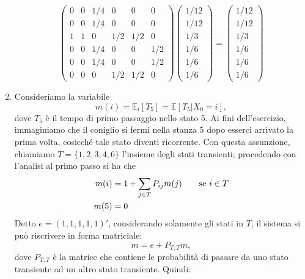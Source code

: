 \documentclass[
	12pt, %
]{fphw}
\begin{document}
\begin{enumerate}
	\begin{equation*}
		\begin{pmatrix}
			0 & 0 & 1/4 & 0 & 0 & 0\\
			0 & 0 & 1/4 & 0 & 0 & 0\\
			1 & 1 & 0 & 1/2 & 1/2 & 0\\
			0 & 0 & 1/4 & 0 & 0 & 1/2\\
			0 & 0 & 1/4 & 0 & 0 & 1/2\\
			0 & 0 & 0 & 1/2 & 1/2 & 0
		\end{pmatrix}
		\begin{pmatrix}
			1/12 \\ 1/12 \\ 1/3 \\ 1/6 \\ 1/6 \\ 1/6
		\end{pmatrix}
		=
		\begin{pmatrix}
			1/12 \\ 1/12 \\ 1/3 \\ 1/6 \\ 1/6 \\ 1/6
		\end{pmatrix}
	\end{equation*}
	\item Consideriamo la variabile
	\begin{equation*}
		m(i) = \mathbb{E}_i [T_5] = \mathbb{E}[T_5 | X_0 = i],
	\end{equation*}
	dove $T_5$ è il tempo di primo passaggio nello stato 5.
	Ai fini dell'esercizio, immaginiamo che il coniglio si fermi nella stanza 5 dopo esserci arrivato la prima volta, cosicché tale stato diventi ricorrente. Con questa assunzione, chiamiamo $T = \{1, 2, 3, 4, 6\}$ l'insieme degli stati transienti; procedendo con l'analisi al primo passo si ha che
	\begin{align*}
		m(i) &= 1 + \sum_{j \in T} P_{ij}m(j) \qquad \textnormal{se } i \in T \\
		m(5) &= 0
	\end{align*}
	Detto $e = (1, 1, 1, 1, 1)'$, considerando solamente gli stati in $T$, il sistema si può riscrivere in forma matriciale:
	\begin{equation*}
		m = e + P_{T,T}m,
	\end{equation*}
	dove $P_{T,T}$ è la matrice che contiene le probabilità di passare da uno stato transiente ad un altro stato transiente.
	Quindi:
	\begin{align*}

\end{align*}
\end{enumerate}
\end{document}
